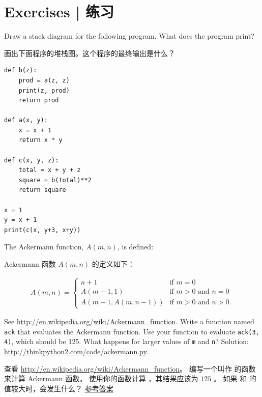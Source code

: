 \section{Exercises  |  练习}

\begin{exercise}

Draw a stack diagram for the following program.  What does the program print?

画出下面程序的堆栈图。这个程序的最终输出是什么？

\begin{lstlisting}
def b(z):
    prod = a(z, z)
    print(z, prod)
    return prod

def a(x, y):
    x = x + 1
    return x * y

def c(x, y, z):
    total = x + y + z
    square = b(total)**2
    return square

x = 1
y = x + 1
print(c(x, y+3, x+y))
\end{lstlisting}

\end{exercise}


\begin{exercise}
\label{ackermann}

The Ackermann function, $A(m, n)$, is defined:

Ackermann 函数 $A(m, n)$ 的定义如下：


\begin{eqnarray*}
A(m, n) = \begin{cases}
              n+1 & \mbox{if } m = 0 \\
        A(m-1, 1) & \mbox{if } m > 0 \mbox{ and } n = 0 \\
A(m-1, A(m, n-1)) & \mbox{if } m > 0 \mbox{ and } n > 0.
\end{cases}
\end{eqnarray*}

%
See \url{http://en.wikipedia.org/wiki/Ackermann_function}.
Write a function named {\tt ack} that evaluates the Ackermann function.
Use your function to evaluate {\tt ack(3, 4)}, which should be 125.
What happens for larger values of {\tt m} and {\tt n}?
Solution: \url{http://thinkpython2.com/code/ackermann.py}.

查看 \url{http://en.wikipedia.org/wiki/Ackermann_function}。
编写一个叫作  的函数来计算 Ackermann 函数。
使用你的函数计算 ，其结果应该为 $125$ 。
如果  和  的值较大时，会发生什么？
\href{http://thinkpython2.com/code/ackermann.py}{参考答案}
  

\end{exercise}


